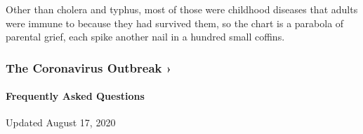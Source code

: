 Other than cholera and typhus, most of those were childhood diseases
that adults were immune to because they had survived them, so the chart
is a parabola of parental grief, each spike another nail in a hundred
small coffins.

\href{https://www.nytimes3xbfgragh.onion/news-event/coronavirus?action=click\&pgtype=Article\&state=default\&region=MAIN_CONTENT_3\&context=storylines_faq}{}

\hypertarget{the-coronavirus-outbreak-}{%
\subsubsection{The Coronavirus Outbreak
›}\label{the-coronavirus-outbreak-}}

\hypertarget{frequently-asked-questions}{%
\paragraph{Frequently Asked
Questions}\label{frequently-asked-questions}}

Updated August 17, 2020

